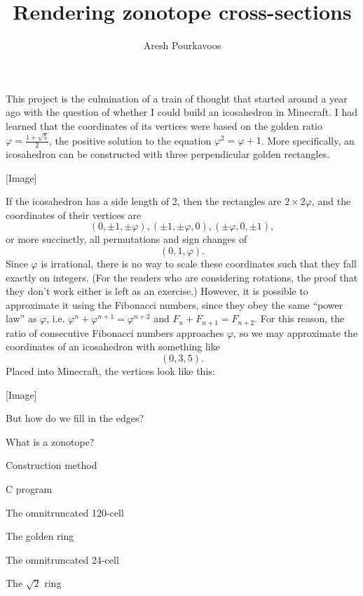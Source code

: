 \documentclass{article}
\begin{document}
\title{Rendering zonotope cross-sections}
\author{Aresh Pourkavoos}
\maketitle

This project is the culmination of a train of thought
that started around a year ago
with the question of whether I could build an icosahedron in Minecraft.
I had learned that the coordinates of its vertices
were based on the golden ratio $\varphi = \frac{1+\sqrt{5}}{2}$,
the positive solution to the equation $\varphi^2 = \varphi+1$.
More specifically,
an icosahedron can be constructed with three perpendicular golden rectangles.

[Image]

If the icosahedron has a side length of 2,
then the rectangles are $2 \times 2\varphi$,
and the coordinates of their vertices are
\[
(0, \pm 1, \pm \varphi),
(\pm 1, \pm \varphi, 0),
(\pm \varphi, 0, \pm 1),
\]
or more succinctly,
all permutations and sign changes of
\[(0, 1, \varphi).\]
Since $\varphi$ is irrational,
there is no way to scale these coordinates
such that they fall exactly on integers.
(For the readers who are considering rotations,
the proof that they don't work either is left as an exercise.)
However, it is possible to approximate it using the Fibonacci numbers,
since they obey the same ``power law'' as $\varphi$,
i.e. $\varphi^{n}+\varphi^{n+1}=\varphi^{n+2}$ and $F_n+F_{n+1}=F_{n+2}$.
For this reason, the ratio of consecutive Fibonacci numbers approaches $\varphi$,
so we may approximate the coordinates of an icosahedron with something like
\[(0, 3, 5).\]
Placed into Minecraft, the vertices look like this:

[Image]

But how do we fill in the edges?

What is a zonotope?

Construction method

C program

The omnitruncated 120-cell

The golden ring

The omnitruncated 24-cell

The $\sqrt{2}$ ring
\end{document}
